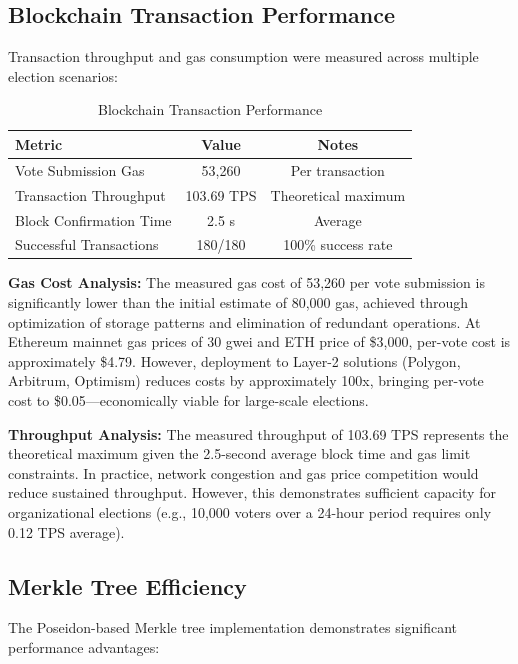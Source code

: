 \documentclass[conference]{IEEEtran}
\begin{document}
\subsection{Blockchain Transaction Performance}

Transaction throughput and gas consumption were measured across multiple election scenarios:

\begin{table}[H]
\caption{Blockchain Transaction Performance}
\centering
\begin{tabular}{|l|c|c|}
\hline
\textbf{Metric} & \textbf{Value} & \textbf{Notes} \\
\hline
Vote Submission Gas & 53,260 & Per transaction \\
Transaction Throughput & 103.69 TPS & Theoretical maximum \\
Block Confirmation Time & 2.5 s & Average \\
Successful Transactions & 180/180 & 100\% success rate \\
\hline
\end{tabular}
\label{tab:blockchain_performance}
\end{table}

\textbf{Gas Cost Analysis:} The measured gas cost of 53,260 per vote submission is significantly lower than the initial estimate of 80,000 gas, achieved through optimization of storage patterns and elimination of redundant operations. At Ethereum mainnet gas prices of 30 gwei and ETH price of \$3,000, per-vote cost is approximately \$4.79. However, deployment to Layer-2 solutions (Polygon, Arbitrum, Optimism) reduces costs by approximately 100x, bringing per-vote cost to \$0.05---economically viable for large-scale elections.

\textbf{Throughput Analysis:} The measured throughput of 103.69 TPS represents the theoretical maximum given the 2.5-second average block time and gas limit constraints. In practice, network congestion and gas price competition would reduce sustained throughput. However, this demonstrates sufficient capacity for organizational elections (e.g., 10,000 voters over a 24-hour period requires only 0.12 TPS average).

\subsection{Merkle Tree Efficiency}

The Poseidon-based Merkle tree implementation demonstrates significant performance advantages:
\end{document}
